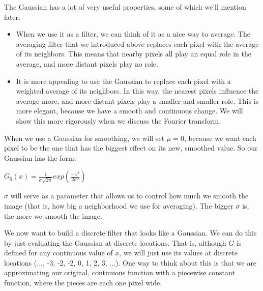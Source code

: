 \documentclass{report}
\begin{document}
The Gaussian has a lot of very useful properties, some of which we'll mention later. 
\begin{itemize}
    \item When we use it as a filter, we can think of it as a nice way to average. The averaging filter that we introduced above replaces each pixel with the average of its neighbors. This means that nearby pixels all play an equal role in the average, and more distant pixels play no role.
    \item It is more appealing to use the Gaussian to replace each pixel with a weighted average of its neighbors. In this way, the nearest pixels influence the average more, and more distant pixels play a smaller and smaller role. This is more elegant, because we have a smooth and continuous change. We will show this more rigorously when we discuss the Fourier transform.
\end{itemize}

When we use a Gaussian for smoothing, we will set $\mu=0$, because we want each pixel to be the one that has the biggest effect on its new, smoothed value. So our Gaussian has the form:\newline\newline
    \centerline{$G_0(x) = \frac{1}{\sigma \sqrt{2 \pi}} exp\left ( \frac{-x^2}{2\sigma^2} \right )$}\newline\newline

$\sigma$ will serve as a parameter that allows us to control how much we smooth the image (that is, how big a neighborhood we use for averaging). The bigger $\sigma$ is, the more we smooth the image.\newline\newline

We now want to build a discrete filter that looks like a Gaussian. We can do this by just evaluating the Gaussian at discrete locations. That is, although $G$ is defined for any continuous value of $x$, we will just use its values at discrete locations (..., -3, -2, -2, 0, 1, 2, 3, ...). One way to think about this is that we are approximating our original, continuous function with a piecewise constant function, where the pieces are each one pixel wide.\newline\newline
\end{document}
